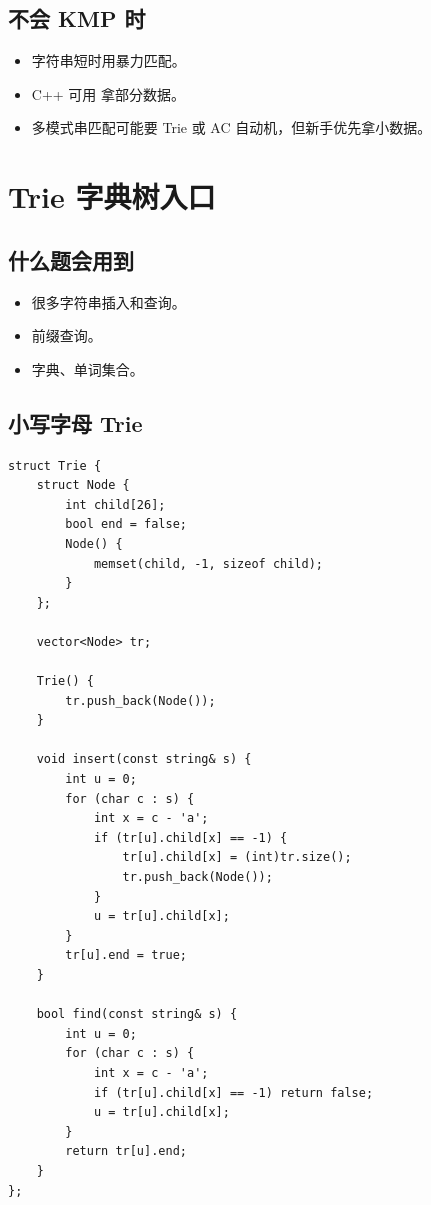 \subsection{不会 KMP 时}

\begin{itemize}
  \item 字符串短时用暴力匹配。
  \item C++ 可用  拿部分数据。
  \item 多模式串匹配可能要 Trie 或 AC 自动机，但新手优先拿小数据。
\end{itemize}

\section{Trie 字典树入口}\label{sec:08-14}

\subsection{什么题会用到}

\begin{itemize}
  \item 很多字符串插入和查询。
  \item 前缀查询。
  \item 字典、单词集合。
\end{itemize}

\subsection{小写字母 Trie}

\begin{lstlisting}
struct Trie {
    struct Node {
        int child[26];
        bool end = false;
        Node() {
            memset(child, -1, sizeof child);
        }
    };

    vector<Node> tr;

    Trie() {
        tr.push_back(Node());
    }

    void insert(const string& s) {
        int u = 0;
        for (char c : s) {
            int x = c - 'a';
            if (tr[u].child[x] == -1) {
                tr[u].child[x] = (int)tr.size();
                tr.push_back(Node());
            }
            u = tr[u].child[x];
        }
        tr[u].end = true;
    }

    bool find(const string& s) {
        int u = 0;
        for (char c : s) {
            int x = c - 'a';
            if (tr[u].child[x] == -1) return false;
            u = tr[u].child[x];
        }
        return tr[u].end;
    }
};
\end{lstlisting}

